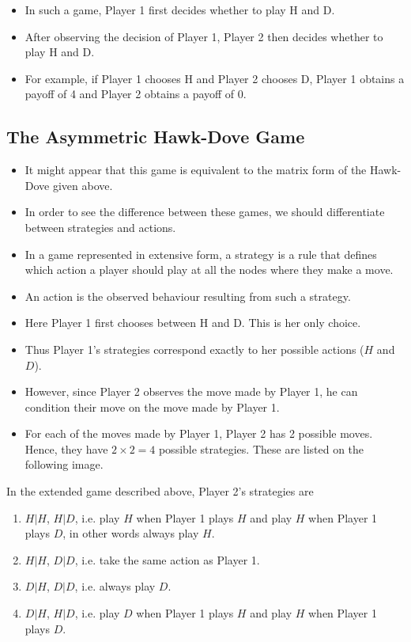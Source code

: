 \documentclass[]{report}
\begin{document}
\begin{itemize}
	\item In such a game, Player 1 first decides whether to play H and D.
	\item After observing the decision of Player 1, Player 2 then decides
	whether to play H and D.
	\item For example, if Player 1 chooses H and Player 2 chooses D, Player
	1 obtains a payoff of 4 and Player 2 obtains a payoff of 0.
\end{itemize}


\subsection{The Asymmetric Hawk-Dove Game}

\begin{itemize}
\item It might appear that this game is equivalent to the matrix form of
	the Hawk-Dove given above.
\item In order to see the difference between these games, we should
	differentiate between strategies and actions.
\item In a game represented in extensive form, a strategy is a rule that
	defines which action a player should play at all the nodes where
	they make a move.
\item An action is the observed behaviour resulting from such a strategy.
\end{itemize}


\begin{itemize}
	\item Here Player 1 first chooses between H and D. This is her only
	choice. 
	\item Thus Player 1’s strategies correspond exactly to her
	possible actions ($H$ and $D$).
	\item However, since Player 2 observes the move made by Player 1, he
	can condition their move on the move made by Player 1.
	\item For each of the moves made by Player 1, Player 2 has 2 possible
	moves. Hence, they have $2 \times 2 = 4$ possible strategies. These are
	listed on the following image.
\end{itemize}

In the extended game described above, Player 2’s strategies are
\begin{enumerate}
	\item  $H|H$, $H|D$, i.e. play $H$ when Player 1 plays $H$ and
	play $H$ when Player 1 plays $D$, in other words always
	play $H$.
	\item  $H|H$, $D|D$, i.e. take the same action as Player 1.
	\item  $D|H$, $D|D$, i.e. always play $D$.
	\item  $D|H$, $H|D$, i.e. play $D$ when Player 1 plays $H$ and
	play $H$ when Player 1 plays $D$.
\end{enumerate}
\end{document}

